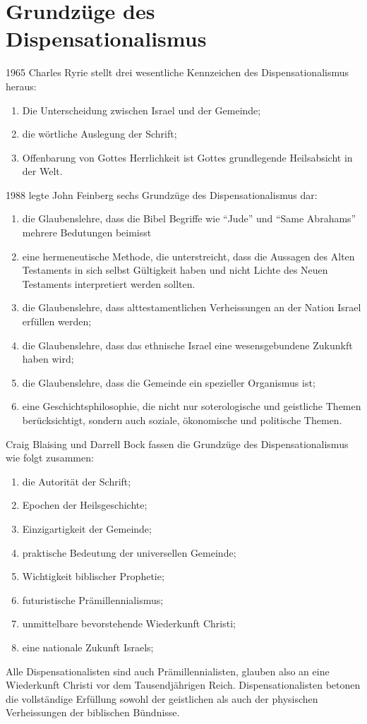 \documentclass{mybib}
\begin{document}
\section{Grundzüge des Dispensationalismus}
1965 Charles Ryrie stellt drei wesentliche Kennzeichen des Dispensationalismus heraus:
\begin{enumerate}
    \item Die Unterscheidung zwischen Israel und der Gemeinde;
    \item die wörtliche Auslegung der Schrift;
    \item Offenbarung von Gottes Herrlichkeit ist Gottes grundlegende Heilsabsicht in der Welt.
\end{enumerate}
1988 legte John Feinberg sechs Grundzüge des Dispensationalismus dar:
\begin{enumerate}
    \item die Glaubenslehre, dass die Bibel Begriffe wie \enquote{Jude} und \enquote{Same Abrahams} mehrere Bedutungen beimisst
    \item eine hermeneutische Methode, die unterstreicht, dass die Aussagen des Alten Testaments in sich selbst Gültigkeit haben und nicht Lichte des Neuen Testaments interpretiert werden sollten.
    \item die Glaubenslehre, dass alttestamentlichen Verheissungen an der Nation Israel erfüllen werden;
    \item die Glaubenslehre, dass das ethnische Israel eine wesensgebundene Zukunkft haben wird;
    \item die Glaubenslehre, dass die Gemeinde ein spezieller Organismus ist;
    \item eine Geschichtsphilosophie, die nicht nur soterologische und geistliche Themen berücksichtigt, sondern auch soziale, ökonomische und politische Themen.
\end{enumerate}
Craig Blaising und Darrell Bock fassen die Grundzüge des Dispensationalismus wie folgt zusammen:
\begin{enumerate}
    \item die Autorität der Schrift;
    \item Epochen der Heilsgeschichte;
    \item Einzigartigkeit der Gemeinde;
    \item praktische Bedeutung der universellen Gemeinde;
    \item Wichtigkeit biblischer Prophetie;
    \item futuristische Prämillennialismus;
    \item unmittelbare bevorstehende Wiederkunft Christi;
    \item eine nationale Zukunft Israels;
\end{enumerate}
Alle Dispensationalisten sind auch Prämillennialisten, glauben also an eine Wiederkunft Christi vor dem Tausendjährigen Reich. Dispensationalisten betonen die vollständige Erfüllung sowohl der geistlichen als auch der physischen Verheissungen der biblischen Bündnisse.
\end{document}
